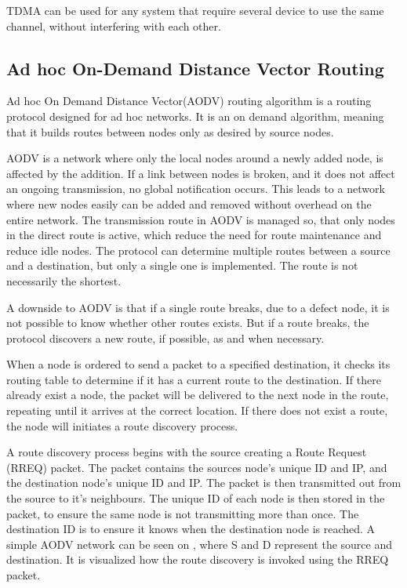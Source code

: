 TDMA can be used for any system that require several device to use the same channel, without interfering with each other.

\subsection{Ad hoc On-Demand Distance Vector Routing}
Ad hoc On Demand Distance Vector(AODV) routing algorithm is a routing protocol designed for ad hoc networks. 
It is an on demand algorithm, meaning that it builds routes between nodes only as desired by source nodes.\cite{AOVD1}

AODV is a network where only the local nodes around a newly added node, is affected by the addition.
If a link between nodes is broken, and it does not affect an ongoing transmission, no global notification occurs.
This leads to a network where new nodes easily can be added and removed without overhead on the entire network.
The transmission  route in AODV is managed so, that only nodes in the direct route is active, which reduce the need for route maintenance and reduce idle nodes.
The protocol can determine multiple routes between a source and a destination, but only a single one is implemented.
The route is not necessarily the shortest.

A downside to AODV is that if a single route breaks, due to a defect node, it is not possible to know whether other routes exists.
But if a route breaks, the protocol discovers a new route, if possible, as and when necessary.

When a node is ordered to send a packet to a specified destination, it checks its routing table to determine if it has a current route to the destination.
If there already exist a node, the packet will be delivered to the next node in the route, repeating until it arrives at the correct location.
If there does not exist a route, the node will initiates a route discovery process.

A route discovery process begins with the source creating a Route Request (RREQ) packet.
The packet contains the sources node's unique ID and IP, and the destination node's unique ID and IP.
The packet is then transmitted out from the source to it's neighbours.
The unique ID of each node is then stored in the packet, to ensure the same node is not transmitting more than once.
The destination ID is to ensure it knows when the destination node is reached.
A simple AODV network can be seen on , where S and D represent the source and destination. It is visualized how the route discovery is invoked using the RREQ packet.\cite{AOVD2}

